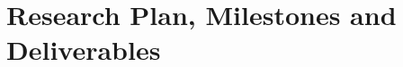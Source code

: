\documentclass[a4paper,11pt]{article}
\begin{document}
\section{Research Plan, Milestones and Deliverables}


\end{document}
